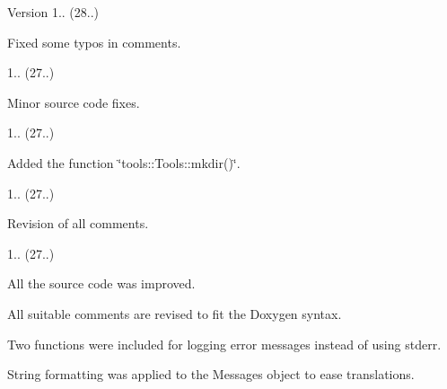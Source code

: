 \begin{DoxyVersion}{Version}
1.. (28..)
\begin{DoxyItemize}
\item Fixed some typos in comments. 
\end{DoxyItemize}

1.. (27..)
\begin{DoxyItemize}
\item Minor source code fixes. 
\end{DoxyItemize}

1.. (27..)
\begin{DoxyItemize}
\item Added the function \char`\"{}tools\+::\+Tools\+::mkdir()\char`\"{}. 
\end{DoxyItemize}

1.. (27..)
\begin{DoxyItemize}
\item Revision of all comments. 
\end{DoxyItemize}

1.. (27..)
\begin{DoxyItemize}
\item All the source code was improved.
\item All suitable comments are revised to fit the Doxygen syntax.
\item Two functions were included for logging error messages instead of using stderr.
\item String formatting was applied to the Messages object to ease translations. 
\end{DoxyItemize}
\end{DoxyVersion}
